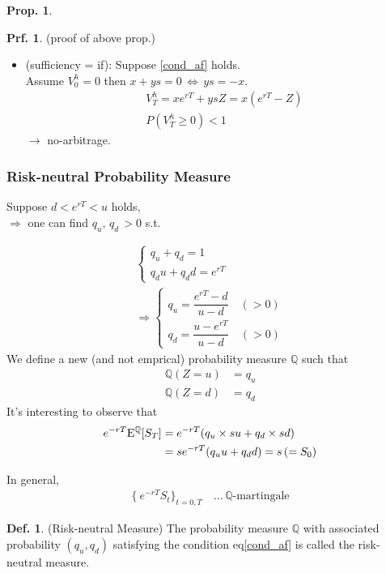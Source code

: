 \documentclass[a4paper,11pt]{jsarticle}
\theoremstyle{definition}
\newtheorem{definition}{Def.}[subsection]
\newtheorem{prf}{Prf.}[subsection]
\newtheorem{prop}{Prop.}[subsection]
\newcommand{\df}[2]{\dfrac{#1}{#2}}
\begin{document}
\begin{prop}
\begin{prf}{(proof of above prop.)}
\begin{itemize}
      \item (sufficiency = if):
      Suppose \ref{cond_af} holds. \\
      Assume $V_0^h=0$ then $x+ys=0 \, \Leftrightarrow \, ys=-x$.
      \begin{align}
        &V_T^h =xe^{rT}+ysZ=x(e^{rT}-Z) \\
        &P(V_T^h\geq 0) < 1
      \end{align}
      $\rightarrow$  no-arbitrage.

    \end{itemize}
  \end{prf}

\end{prop}

\subsubsection{Risk-neutral Probability Measure}
Suppose $d<e^{rT}<u$ holds, \\
$\Rightarrow$ one can find $q_u, \, q_d \, >0$ s.t.

\begin{align}
  \begin{cases}
    q_u+q_d=1 \\
    q_d u+q_d d=e^{rT}
  \end{cases} \\
  \Rightarrow
  \begin{cases}
    q_u=\df{e^{rT}-d}{u-d} \quad (>0) \\
    q_d=\df{u-e^{rT}}{u-d} \quad (>0)
  \end{cases}
\end{align}
We define a new (and not emprical) probability measure
$\mathbb{Q}$ such that
\begin{align}
  \mathbb{Q}(Z=u)&=q_u \\
  \mathbb{Q}(Z=d)&=q_d
\end{align}
It's interesting to observe that
\begin{align}
  e^{-rT}\mathrm{E}^{\mathbb{Q}}[S_T]
  &=e^{-rT}(q_u\times su+q_d\times sd) \notag \\
  &=se^{-rT}(q_u u+q_d d)=s\,(=S_0)
\end{align}

In general,
\begin{align}
  \{\ e^{-rT}S_t \}_{t=0,T} \quad ... \, \mathbb{Q}
  \mbox{-martingale}
\end{align}

\begin{definition}{(Risk-neutral Measure)}
  The probability measure $\mathbb{Q}$ with associated
  probability $(q_u, q_d)$ satisfying the condition
  eq\eqref{cond_af} is called the risk-neutral measure.
\end{definition}
\end{document}
